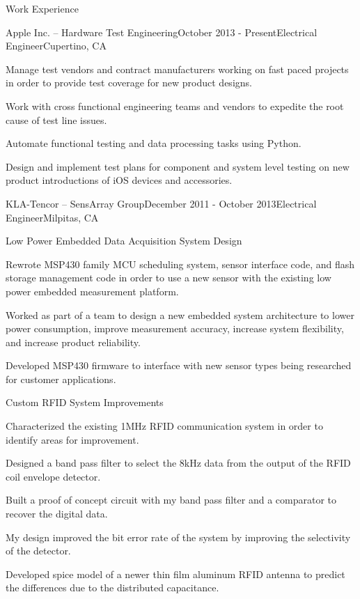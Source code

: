 \documentclass{resume} %
\begin{document}
\begin{rSection}{Work Experience}
\begin{rSubsection}{Apple Inc. -- Hardware Test Engineering}{October 2013 - Present}{Electrical Engineer}{Cupertino, CA}
\item Manage test vendors and contract manufacturers working on fast paced projects in order to provide test coverage for new product designs.
\item Work with cross functional engineering teams and vendors to expedite the root cause of test line issues.
\item Automate functional testing and data processing tasks using Python.
\item Design and implement test plans for component and system level testing on new product introductions of iOS devices and accessories.
\end{rSubsection}


\begin{rSubsection2}{KLA-Tencor -- SensArray Group}{December 2011 - October 2013}{Electrical Engineer}{Milpitas, CA}

\ssquish
\begin{rWorkProject}{Low Power Embedded Data Acquisition System Design}
\item Rewrote MSP430 family MCU scheduling system, sensor interface code, and flash storage management code in order to use a new sensor with the existing low power embedded measurement platform.
\item Worked as part of a team to design a new embedded system architecture to lower power consumption, improve measurement accuracy, increase system flexibility, and increase product reliability.
\item Developed MSP430 firmware to interface with new sensor types being researched for customer applications.
\end{rWorkProject}

\pagebreak[1]
\begin{rWorkProject}{Custom RFID System Improvements}
\item Characterized the existing 1MHz RFID communication system in order to identify areas for improvement.
\item Designed a band pass filter to select the 8kHz data from the output of the RFID coil envelope detector.
\item Built a proof of concept circuit with my band pass filter and a comparator to recover the digital data.
\item My design improved the bit error rate of the system by improving the selectivity of the detector.
\item Developed spice model of a newer thin film aluminum RFID antenna to predict the differences due to the distributed capacitance.
\end{rWorkProject}


\end{rSubsection2}
\end{rSection}
\end{document}
